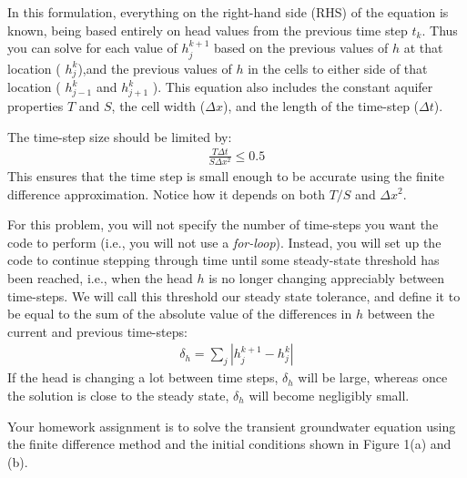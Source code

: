 \documentclass[11pt, oneside]{article}   	%
\begin{document}
In this formulation, everything on the right-hand side (RHS) of the equation is known, being based entirely on head values from the previous time step $t_k$. Thus you can solve for each value of  $h_j^{k+1}$ based on the previous values of $h$ at that location ( $h_j^{k}$),and  the previous values of $h$ in the cells to either side of that location ( $h_{j-1}^{k}$ and $h_{j+1}^{k}$ ).
 This equation also includes the constant aquifer properties $T$ and $S$, the cell width ($\Delta x$), and the length of the time-step ($\Delta t$). 

The time-step size should be limited by:
\begin{eqnarray}
 \frac{T\Delta t}{S\Delta x^2} \le 0.5
\end{eqnarray}
This ensures that the time step is small enough to be accurate using the finite difference approximation. Notice how it depends on both $T/S$ and $\Delta x^2$.

For this problem, you will not specify the number of time-steps you want the code to perform (i.e., you will not use a {\it for-loop}).  Instead, you will set up the code to continue stepping through time until some steady-state threshold has been reached, i.e., when the head $h$ is no longer changing appreciably between time-steps.  We will call this threshold our steady state tolerance, and define it to be equal to the sum of the absolute value of the differences in $h$ between the current and previous time-steps:
\begin{eqnarray}
\delta_h = \sum_j | h_j^{k+1} - h_j^k |
\end{eqnarray}
If the head is changing a lot between time steps, $\delta_h$ will be large, whereas once the solution is close to the steady state,  $\delta_h$ will become negligibly small.

Your homework assignment is to solve the transient groundwater equation using the finite difference method and the initial conditions shown in Figure 1(a) and (b). 
\end{document}
